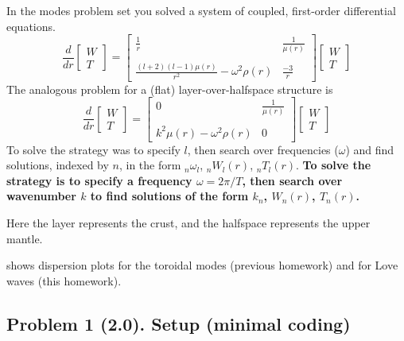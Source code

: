 \documentclass[11pt,titlepage,fleqn]{article}
\begin{document}
In the modes problem set you solved a system of coupled, first-order differential equations.
%
\begin{equation}
\frac{d}{dr}
\left[ \begin{array}{c} W \\ T \end{array} \right]
=
\left[ \begin{array}{cc}
\frac{1}{r} & \frac{1}{\mu(r)} \\
& \\
\frac{(l+2)(l-1)\mu(r)}{r^2} -\omega^2\rho(r)  & \frac{-3}{r}
\end{array} \right]
\left[ \begin{array}{c} W \\ T \end{array} \right]
\label{ODEs}
\end{equation}
%
The analogous problem for a (flat) layer-over-halfspace structure is
%
\begin{equation}
\frac{d}{dr}
\left[ \begin{array}{c} W \\ T \end{array} \right]
=
\left[ \begin{array}{cc}
0 & \frac{1}{\mu(r)} \\
& \\
k^2 \mu(r)-\omega^2\rho(r) & 0
\end{array} \right]
\left[ \begin{array}{c} W \\ T \end{array} \right]
\label{rODEs}
\end{equation}
%
To solve  the strategy was to specify $l$, then search over frequencies ($\omega$) and find solutions, indexed by $n$, in the form $_n\omega_l$, $_nW_l(r)$, $_nT_l(r)$. {\bf To solve  the strategy is to specify a frequency $\omega = 2\pi/T$, then search over wavenumber $k$ to find solutions of the form $k_n$, $W_n(r)$, $T_n(r)$.}

Here the layer represents the crust, and the halfspace represents the upper mantle.

 shows dispersion plots for the toroidal modes (previous homework) and for Love waves (this homework).


\subsection*{Problem 1 (2.0). Setup (minimal coding)}
\end{document}
